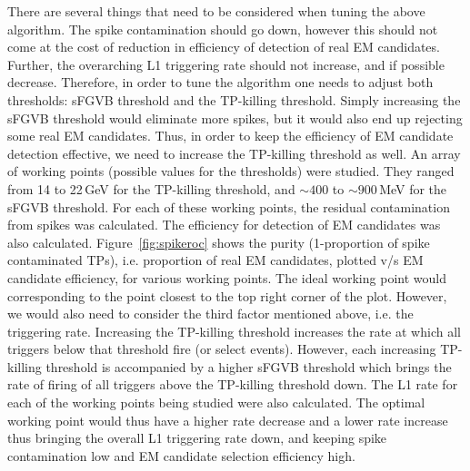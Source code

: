 There are several things that need to be considered when tuning the above algorithm. The spike contamination should go down, however this should not come at the cost of reduction in efficiency of detection of real EM candidates. Further, the overarching L1 triggering rate should not increase, and if possible decrease. Therefore, in order to tune the algorithm one needs to adjust both thresholds: sFGVB threshold and the TP-killing threshold. Simply increasing the sFGVB threshold would eliminate more spikes, but it would also end up rejecting some real EM candidates. Thus, in order to keep the efficiency of EM candidate detection effective, we need to increase the TP-killing threshold as well. An array of working points (possible values for the thresholds) were studied. They ranged from 14 to 22\,GeV for the TP-killing threshold, and $\sim400$ to $\sim900\,$MeV for the sFGVB threshold. For each of these working points, the residual contamination from spikes was calculated. The efficiency for detection of EM candidates was also calculated. Figure~\ref{fig:spikeroc} shows the purity (1-proportion of spike contaminated TPs), i.e. proportion of real EM candidates, plotted v/s EM candidate efficiency, for various working points. The ideal working point would corresponding to the point closest to the top right corner of the plot. However, we would also need to consider the third factor mentioned above, i.e. the triggering rate. Increasing the TP-killing threshold increases the rate at which all triggers below that threshold fire (or select events). However, each increasing TP-killing threshold is accompanied by a higher sFGVB threshold which brings the rate of firing of all triggers above the TP-killing threshold down. The L1 rate for each of the working points being studied were also calculated. The optimal working point would thus have a higher rate decrease and a lower rate increase thus bringing the overall L1 triggering rate down, and keeping spike contamination low and EM candidate selection efficiency high.


